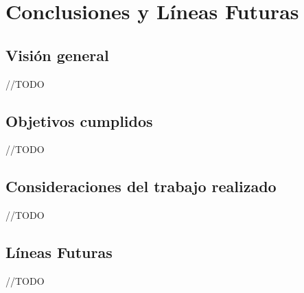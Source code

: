 \chapter{Conclusiones y Líneas Futuras}

\section{Visión general}

	//TODO

\section{Objetivos cumplidos}

	//TODO

\section{Consideraciones del trabajo realizado}

	//TODO

\section{Líneas Futuras}

	//TODO